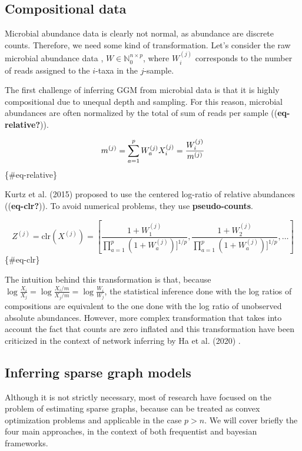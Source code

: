 \documentclass[
]{article}
\begin{document}
\hypertarget{compositional-data}{%
\subsection{Compositional data}\label{compositional-data}}

Microbial abundance data is clearly not normal, as abundance are
discrete counts. Therefore, we need some kind of transformation. Let's
consider the raw microbial abundance data ,
\(W \in \mathbb N_0^{n\times p}\), where \(W_i^{(j)}\) corresponds to
the number of reads assigned to the \(i\)-taxa in the \(j\)-sample.

The first challenge of inferring GGM from microbial data is that it is
highly compositional due to unequal depth and sampling. For this reason,
microbial abundances are often normalized by the total of sum of reads
per sample ((\textbf{eq-relative?})).

\[
m^{(j)} = \sum_{a=1}^p W_a^{(j)}\\
X_i^{(j)}  = \frac {W_i^{(j)}}{
m^{(j)}}
\] \{\#eq-relative\}

Kurtz et al. (2015) proposed to use the centered log-ratio of relative
abundances ((\textbf{eq-clr?})). To avoid numerical problems, they use
\textbf{pseudo-counts}.

\[
Z^{(j)} = \text{clr}(X^{(j)}) = [\frac{1+W_1^{(j)}}{\prod _{a=1}^p (1+W_a^{(j)}) ]^{1/p}}, \frac{1+W_2^{(j)}}{\prod _{a=1}^p (1+W_a^{(j)}) ]^{1/p}}, \dots]
\] \{\#eq-clr\}

The intuition behind this transformation is that, because
\(\log{\frac {X_i}{X_j}} = \log{\frac {X_i/m}{X_j/m}} = \log{\frac {W_i}{W_j}}\),
the statistical inference done with the log ratios of compositions are
equivalent to the one done with the log ratio of unobserved absolute
abundances. However, more complex transformation that takes into account
the fact that counts are zero inflated and this transformation have been
criticized in the context of network inferring by Ha et al. (2020) .

\hypertarget{inferring-sparse-graph-models}{%
\subsection{Inferring sparse graph
models}\label{inferring-sparse-graph-models}}

Although it is not strictly necessary, most of research have focused on
the problem of estimating sparse graphs, because can be treated as
convex optimization problems and applicable in the case \(p>n\). We will
cover briefly the four main approaches, in the context of both
frequentist and bayesian frameworks.
\end{document}
